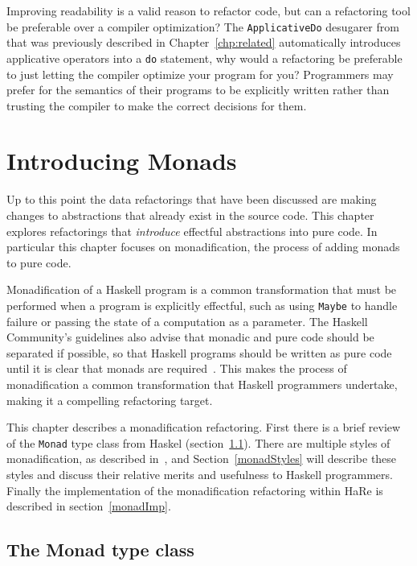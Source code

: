 Improving readability is a valid reason to refactor code, but can a refactoring tool be preferable over a compiler optimization? The \texttt{ApplicativeDo}  desugarer from~\cite{applicativeDo} that was previously described in Chapter~\ref{chp:related} automatically introduces applicative operators into a \texttt{do} statement, why would a refactoring be preferable to just letting the compiler optimize your program for you? Programmers may prefer for the semantics of their programs to be explicitly written rather than trusting the compiler to make the correct decisions for them.

   

\chapter{Introducing Monads}
\label{chp:monadification}

Up to this point the data refactorings that have been discussed are making changes to abstractions that already exist in the source code. This chapter explores refactorings that \textit{introduce} effectful abstractions into pure code. In particular this chapter focuses on monadification, the process of adding monads to pure code. 

Monadification of a Haskell program is a common transformation that must be performed when a program is explicitly effectful, such as using \texttt{Maybe} to handle failure or passing the state of a computation as a parameter. The Haskell Community's guidelines also advise that monadic and pure code should be separated if possible, so that Haskell programs should be written as pure code until it is clear that monads are required~\citep{guidelines}. This makes the process of monadification a common transformation that Haskell programmers undertake, making it a compelling refactoring target.

This chapter describes a monadification refactoring. First there is a brief review of the \texttt{Monad} type class from Haskel (section~\ref{monTC}). There are multiple styles of monadification, as described in~\citep{monadSurvey}, and Section~\ref{monadStyles} will describe these styles and discuss their relative merits and usefulness to Haskell programmers. Finally the implementation of the monadification refactoring within HaRe is described in section~\ref{monadImp}.
 
\section{The Monad type class}
\label{monTC}

